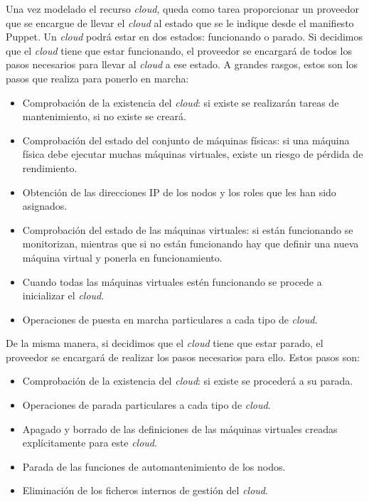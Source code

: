 Una vez modelado el recurso \emph{cloud}, queda como tarea proporcionar un proveedor que se encargue de llevar el \emph{cloud} al estado que se le indique desde el manifiesto Puppet. Un \emph{cloud} podrá estar en dos estados: funcionando o parado. Si decidimos que el \emph{cloud} tiene que estar funcionando, el proveedor se encargará de todos los pasos necesarios para llevar al \emph{cloud} a ese estado. A grandes rasgos, estos son los pasos que realiza para ponerlo en marcha:
\begin{itemize}
\item Comprobación de la existencia del \emph{cloud}: si existe se realizarán tareas de mantenimiento, si no existe se creará.
\item Comprobación del estado del conjunto de máquinas físicas: si una máquina física debe ejecutar muchas máquinas virtuales, existe un riesgo de pérdida de rendimiento.
\item Obtención de las direcciones IP de los nodos y los roles que les han sido asignados.
\item Comprobación del estado de las máquinas virtuales: si están funcionando se monitorizan, mientras que si no están funcionando hay que definir una nueva máquina virtual y ponerla en funcionamiento.
\item Cuando todas las máquinas virtuales estén funcionando se procede a inicializar el \emph{cloud}.
\item Operaciones de puesta en marcha particulares a cada tipo de \emph{cloud}.
\end{itemize}

De la misma manera, si decidimos que el \emph{cloud} tiene que estar parado, el proveedor se encargará de realizar los pasos necesarios para ello. Estos pasos son:
\begin{itemize}
\item Comprobación de la existencia del \emph{cloud}: si existe se procederá a su parada.
\item Operaciones de parada particulares a cada tipo de \emph{cloud}.
\item Apagado y borrado de las definiciones de las máquinas virtuales creadas explícitamente para este \emph{cloud}.
\item Parada de las funciones de automantenimiento de los nodos.
\item Eliminación de los ficheros internos de gestión del \emph{cloud}.
\end{itemize}
